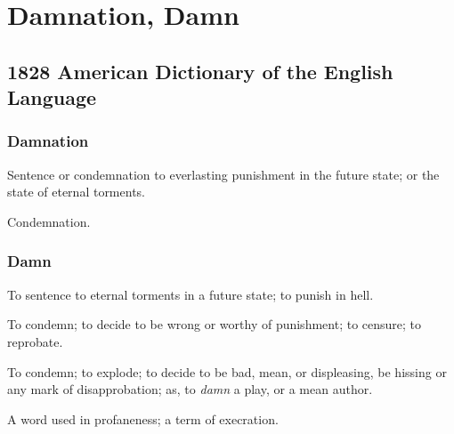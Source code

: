 \section{Damnation, Damn}
	\label{DAMNATION}
	

\subsection{1828 American Dictionary of the English Language} %
	\label{DAMNATION-1828}
	
		\subsubsection{Damnation}

			\begin{compactitem}
				\item[1] Sentence or condemnation to everlasting punishment in the future state; or the state of eternal torments.
				\item[2] Condemnation.
			\end{compactitem}
			
		\subsubsection{Damn}

			\begin{compactitem}
				\item[1] To sentence to eternal torments in a future state; to punish in hell.
				\item[2] To condemn; to decide to be wrong or worthy of punishment; to censure; to reprobate.
				\item[3] To condemn; to explode; to decide to be bad, mean, or displeasing, be hissing or any mark of disapprobation; as, to \textit{damn} a play, or a mean author.
				\item[4] A word used in profaneness; a term of execration.
			\end{compactitem}

